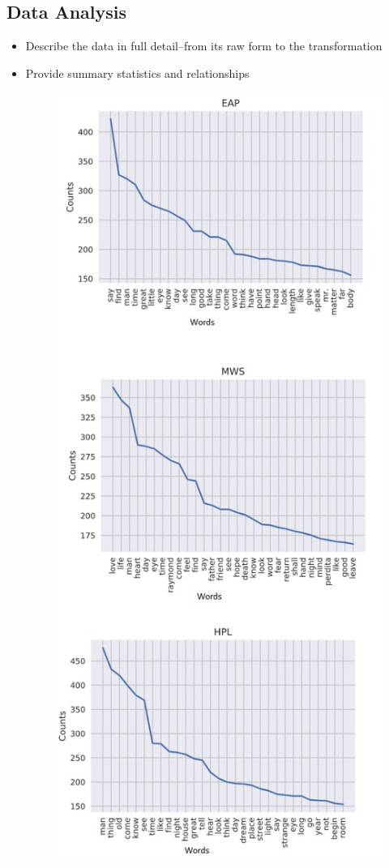 \documentclass[fleqn,10pt]{SelfArx} %
\begin{document}
\subsection{Data Analysis}
\begin{itemize}[noitemsep]
\item Describe the data in full detail--from its raw form to the transformation
\item Provide summary statistics and relationships

\begin{figure}[H]\centering
	\includegraphics[width=\linewidth]{merge_from_ofoct.jpg}

\end{figure}
\end{itemize}
\end{document}
